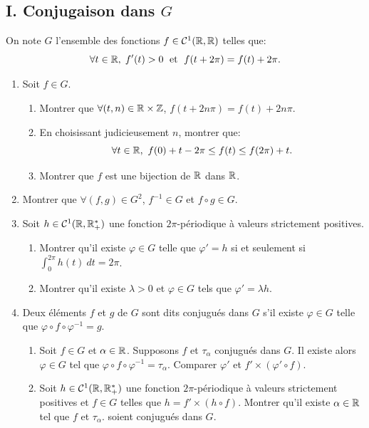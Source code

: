 \subsection*{I. Conjugaison dans $G$}
On note $G$ l'ensemble des fonctions $f\in \mathcal{C}^{1}(\mathbb{R}, \mathbb{R})$ telles que:
\[
 \forall t\in \mathbb{R},\;  f'(t) > 0 \; \text{ et } \; f(t+2\pi) = f(t) + 2\pi.
\]

\begin{enumerate}
 \item Soit $f\in G$. 
 \begin{enumerate}
  \item Montrer que $\forall (t, n)\in \mathbb{R} \times \mathbb{Z}$, $f(t+2n\pi) = f(t) + 2n\pi$. 
  \item En choisissant judicieusement $n$, montrer que: 
  \[\forall t\in \mathbb{R},\ f(0) + t - 2\pi \leq f(t) \leq f(2\pi) + t.\]
  \item Montrer que $f$ est une bijection de $\mathbb{R}$ dans $\mathbb{R}$.
 \end{enumerate}
 
 \item Montrer que $\forall (f,g)\in G^2$, $f^{-1}\in G$ et $f\circ g \in G$.
 
 \item Soit $h\in \mathcal{C}^{1}(\mathbb{R}, \mathbb{R}_{+}^{*})$ une fonction $2\pi$-périodique à valeurs strictement positives. 
 \begin{enumerate}
   \item Montrer qu'il existe $\varphi \in G$ telle que $\varphi ' = h$ si et seulement si 
   $\displaystyle{\int_{0}^{2\pi}h(t)\ dt = 2\pi}$.
   \item Montrer qu'il existe $\lambda > 0$ et $\varphi \in G$ tels que $\varphi' = \lambda h$.
 \end{enumerate}
 
 \item Deux éléments $f$ et $g$ de $G$ sont dits conjugués dans $G$ s'il existe $\varphi \in G$ telle que $\varphi \circ f \circ \varphi^{-1} = g$.
 \begin{enumerate}
  \item Soit $f\in G$ et $\alpha \in \mathbb{R}$. Supposons $f$ et $\tau_{\alpha}$ conjugués dans $G$. Il existe alors $\varphi \in G$ tel que $\varphi \circ f \circ \varphi^{-1} = \tau_{\alpha}$. Comparer $\varphi'$ et $f' \times (\varphi ' \circ f)$.
  \item Soit $h\in \mathcal{C}^{1}(\mathbb{R}, \mathbb{R}_{+}^{*})$ une fonction $2\pi$-périodique à valeurs strictement positives et $f\in G$ telles que $h = f' \times (h\circ f)$.\newline
  Montrer qu'il existe $\alpha \in \mathbb{R}$ tel que $f$ et $\tau_{\alpha}$. 
soient conjugués dans $G$.
 \end{enumerate}



\end{enumerate}
